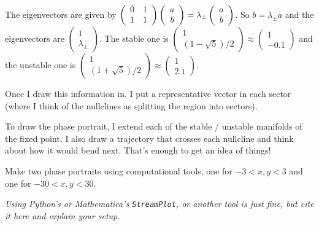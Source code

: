 \documentclass[12pt,letterpaper]{exam}
\begin{document}
\begin{questions}
\begin{parts}
\begin{solution}
The eigenvectors are given by $\left(\begin{array}{c c} 0 & 1 \\ 1 & 1 \end{array}\right)\left(\begin{array}{c} a \\ b\end{array}\right) = \lambda_{\pm}\left(\begin{array}{c} a \\ b\end{array}\right)$.  So $b = \lambda_{\pm} a$ and the eigenvectors are $\left(\begin{array}{c} 1 \\ \lambda_{\pm} \end{array}\right)$.  The stable one is $\left(\begin{array}{c} 1 \\ (1-\sqrt{5})/2 \end{array}\right) \approx \left(\begin{array}{c} 1 \\ -0.1 \end{array}\right)$ and the unstable one is $\left(\begin{array}{c} 1 \\ (1+\sqrt{5})/2 \end{array}\right) \approx \left(\begin{array}{c} 1 \\ 2.1 \end{array}\right)$.

Once I draw this information in, I put a representative vector in each sector (where I think of the nullclines as splitting the region into sectors).


To draw the phase portrait, I extend each of the stable / unstable manifolds of the fixed point.  I also draw a trajectory that crosses each nullcline and think about how it would bend next.  That's enough to get an idea of things!


\end{solution}


\item Make two phase portraits using computational tools, one for $-3<x,y<3$ and one for $-30<x,y<30$.  

\emph{Using Python's or Mathematica's \texttt{StreamPlot}, or another tool is just fine, but cite it here and explain your setup.}


\end{parts}
\end{questions}
\end{document}

